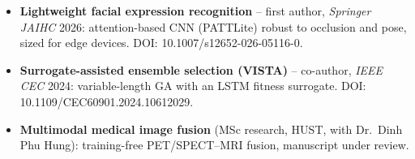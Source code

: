 \begin{itemize}
  \item \textbf{Lightweight facial expression recognition} -- first author, \emph{Springer JAIHC} 2026: attention-based CNN (PATTLite) robust to occlusion and pose, sized for edge devices. DOI: 10.1007/s12652-026-05116-0.
  \item \textbf{Surrogate-assisted ensemble selection (VISTA)} -- co-author, \emph{IEEE CEC} 2024: variable-length GA with an LSTM fitness surrogate. DOI: 10.1109/CEC60901.2024.10612029.
  \item \textbf{Multimodal medical image fusion} (MSc research, HUST, with Dr.\ Dinh Phu Hung): training-free PET/SPECT--MRI fusion, manuscript under review.
\end{itemize}
\vspace{6pt}
